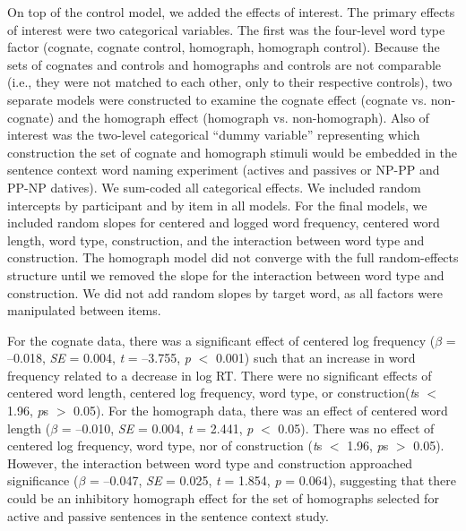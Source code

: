 On top of the control model, we added the effects of interest. The primary effects of interest were two categorical variables. The first was the four-level word type factor (cognate, cognate control, homograph, homograph control). Because the sets of cognates and controls and homographs and controls are not comparable (i.e., they were not matched to each other, only to their respective controls), two separate models were constructed to examine the cognate effect (cognate vs. non-cognate) and the homograph effect (homograph vs. non-homograph). Also of interest was the two-level categorical ``dummy variable'' representing which construction the set of cognate and homograph stimuli would be embedded in the sentence context word naming experiment (actives and passives or NP-PP and PP-NP datives). We sum-coded all categorical effects. We included random intercepts by participant and by item in all models. For the final models, we included random slopes for centered and logged word frequency, centered word length, word type, construction, and the interaction between word type and construction. The homograph model did not converge with the full random-effects structure until we removed the slope for the interaction between word type and construction. We did not add random slopes by target word, as all factors were manipulated between items.

For the cognate data, there was a significant effect of centered log frequency (\emph{$\beta$} = --0.018, \emph{SE} = 0.004, \emph{t} = --3.755, \emph{p} $<$ 0.001) such that an increase in word frequency related to a decrease in log RT. There were no significant effects of centered word length, centered log frequency, word type, or construction(\emph{t}s $<$ 1.96, \emph{p}s $>$ 0.05). For the homograph data, there was an effect of centered word length (\emph{$\beta$} = --0.010, \emph{SE} = 0.004, \emph{t} = 2.441, \emph{p} $<$ 0.05). There was no effect of centered log frequency, word type, nor of construction (\emph{t}s $<$ 1.96, \emph{p}s $>$ 0.05). However, the interaction between word type and construction approached significance (\emph{$\beta$} = --0.047, \emph{SE} = 0.025, \emph{t} = 1.854, \emph{p} = 0.064), suggesting that there could be an inhibitory homograph effect for the set of homographs selected for active and passive sentences in the sentence context study.

